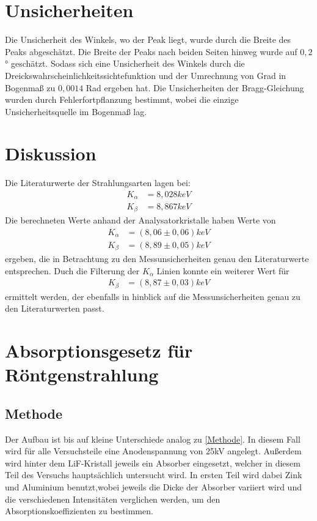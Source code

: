 \documentclass[
	a4paper,
	12pt,
	pagesize,
	ngerman
]{scrartcl}
\begin{document}
\section{Unsicherheiten}
Die Unsicherheit des Winkels, wo der Peak liegt, wurde durch die Breite des Peaks abgeschätzt. Die Breite der Peaks nach beiden Seiten hinweg wurde auf $0,2$° geschätzt. Sodass sich eine Unsicherheit des Winkels durch die Dreickswahrscheinlichkeitssichtefunktion und der Umrechnung von Grad in Bogenmaß zu $0,0014$ Rad ergeben hat.
Die Unsicherheiten der Bragg-Gleichung wurden durch Fehlerfortpflanzung bestimmt, wobei die einzige Unsicherheitsquelle im Bogenmaß lag.

\section{Diskussion}
Die Literaturwerte der Strahlungsarten lagen bei:
\begin{align*}
    K_{\alpha} &= 8,028 keV \\
    K_{\beta} &= 8,867 keV
\end{align*}
Die berechneten Werte anhand der Analysatorkristalle haben Werte von
\begin{align*}
    K_{\alpha} &= (8,06 \pm 0,06) keV \\
    K_{\beta} &= (8,89 \pm 0,05) keV
\end{align*}
ergeben, die in Betrachtung zu den Messunsicherheiten genau den Literaturwerte entsprechen. Duch die Filterung der $K_{\alpha}$ Linien konnte ein weiterer Wert für 
\begin{align*}
    K_{\beta} &= (8,87 \pm 0,03)keV
\end{align*}
ermittelt werden, der ebenfalls in hinblick auf die Messunsicherheiten genau zu den Literaturwerten passt.

\section{Absorptionsgesetz für Röntgenstrahlung}
\subsection{Methode}
Der Aufbau ist bis auf kleine Unterschiede analog zu \cref{Methode}. In diesem Fall wird für alle Versuchsteile eine Anodenspannung von 25kV angelegt. Außerdem wird hinter dem LiF-Kristall jeweils ein Absorber eingesetzt, welcher in diesem Teil des Versuchs hauptsächlich untersucht wird. In ersten Teil wird dabei Zink und Aluminium benutzt,wobei jeweils die Dicke der Absorber variiert wird und die verschiedenen Intensitäten verglichen werden, um den Absorptionskoeffizienten zu bestimmen. 
\end{document}
